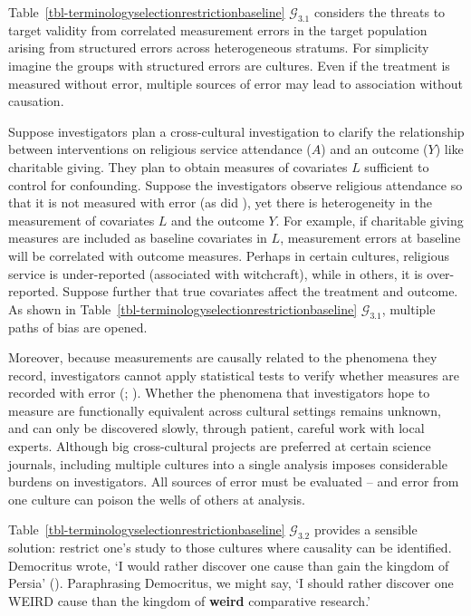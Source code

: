 \documentclass[
  single column]{article}
\begin{document}
Table~\ref{tbl-terminologyselectionrestrictionbaseline}
\(\mathcal{G}_{3.1}\) considers the threats to target validity from
correlated measurement errors in the target population arising from
structured errors across heterogeneous stratums. For simplicity imagine
the groups with structured errors are cultures. Even if the treatment is
measured without error, multiple sources of error may lead to
association without causation.

Suppose investigators plan a cross-cultural investigation to clarify the
relationship between interventions on religious service attendance
(\(A\)) and an outcome (\(Y\)) like charitable giving. They plan to
obtain measures of covariates \(L\) sufficient to control for
confounding. Suppose the investigators observe religious attendance so
that it is not measured with error (as did
), yet
there is heterogeneity in the measurement of covariates \(L\) and the
outcome \(Y\). For example, if charitable giving measures are included
as baseline covariates in \(L\), measurement errors at baseline will be
correlated with outcome measures. Perhaps in certain cultures, religious
service is under-reported (associated with witchcraft), while in others,
it is over-reported. Suppose further that true covariates affect the
treatment and outcome. As shown in
Table~\ref{tbl-terminologyselectionrestrictionbaseline}
\(\mathcal{G}_{3.1}\), multiple paths of bias are opened.

Moreover, because measurements are causally related to the phenomena
they record, investigators cannot apply statistical tests to verify
whether measures are recorded with error
(;
). Whether
the phenomena that investigators hope to measure are functionally
equivalent across cultural settings remains unknown, and can only be
discovered slowly, through patient, careful work with local experts.
Although big cross-cultural projects are preferred at certain science
journals, including multiple cultures into a single analysis imposes
considerable burdens on investigators. All sources of error must be
evaluated -- and error from one culture can poison the wells of others
at analysis.

Table~\ref{tbl-terminologyselectionrestrictionbaseline}
\(\mathcal{G}_{3.2}\) provides a sensible solution: restrict one's study
to those cultures where causality can be identified. Democritus wrote,
`I would rather discover one cause than gain the kingdom of Persia'
(). Paraphrasing
Democritus, we might say, `I should rather discover one WEIRD cause than
the kingdom of \textbf{weird} comparative research.'
\end{document}
